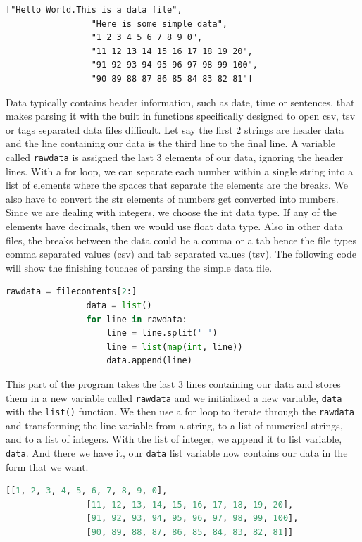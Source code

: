\documentclass[11pt,a4paper]{book}
\begin{document}
				\begin{lstlisting}[caption = {contents of filescontents variable}]
				["Hello World.This is a data file",
				 "Here is some simple data",
				 "1 2 3 4 5 6 7 8 9 0",
				 "11 12 13 14 15 16 17 18 19 20",
				 "91 92 93 94 95 96 97 98 99 100",
				 "90 89 88 87 86 85 84 83 82 81"]
				\end{lstlisting}
				
				Data typically contains header information, such as date, time or sentences, that makes parsing it with the built in functions specifically designed to open csv, tsv or tags separated data files difficult. Let say the first 2 strings are header data and the line containing our data is the third line to the final line. A variable called \lstinline|rawdata| is assigned the last 3 elements of our data, ignoring the header lines. With a for loop, we can separate each number within a single string into a list of elements where the spaces that separate the elements are the breaks. We also have to convert the str elements of numbers get converted into numbers. Since we are dealing with integers, we choose the int data type. If any of the elements have decimals, then we would use float data type. Also in other data files, the breaks between the data could be a comma or a tab hence the file types comma separated values (csv) and tab separated values (tsv). The following code will show the finishing touches of parsing the simple data file.
				
				\begin{lstlisting}[language=Python, caption = Iterating through the raw data to create the final data]
				rawdata = filecontents[2:]
				data = list()
				for line in rawdata:
					line = line.split(' ')
					line = list(map(int, line))
					data.append(line)
				\end{lstlisting}
				
				This part of the program takes the last 3 lines containing our data and stores them in a new variable called \lstinline|rawdata| and we initialized a new variable, \lstinline|data| with the \lstinline|list()| function. We then use a for loop to iterate through the \lstinline|rawdata| and transforming the line variable from a string, to a list of numerical strings, and to a list of integers. With the list of integer, we append it to list variable, \lstinline|data|. And there we have it, our \lstinline|data| list variable now contains our data in the form that we want.
				
				\begin{lstlisting}[language=Python, caption = Contents of the data variable]
				[[1, 2, 3, 4, 5, 6, 7, 8, 9, 0],
				[11, 12, 13, 14, 15, 16, 17, 18, 19, 20],
				[91, 92, 93, 94, 95, 96, 97, 98, 99, 100],
				[90, 89, 88, 87, 86, 85, 84, 83, 82, 81]]
				\end{lstlisting}
\end{document}
